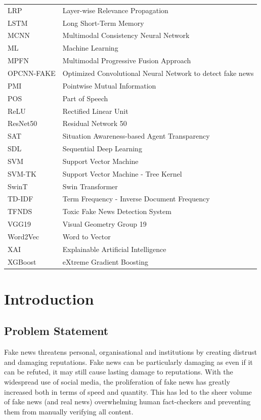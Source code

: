 \documentclass[stu,12pt,floatsintext,donotrepeattitle]{apa7}
\begin{document}
\begin{longtable}{p{3cm} p{10cm}}
LRP & Layer-wise Relevance Propagation \\
LSTM & Long Short-Term Memory \\
MCNN & Multimodal Consistency Neural Network \\
ML & Machine Learning \\
MPFN & Multimodal Progressive Fusion Approach \\
OPCNN-FAKE & Optimized Convolutional Neural Network to detect fake news \\
PMI & Pointwise Mutual Information \\
POS & Part of Speech \\
ReLU & Rectified Linear Unit \\
ResNet50 & Residual Network 50 \\
SAT & Situation Awareness-based Agent Transparency \\
SDL & Sequential Deep Learning \\
SVM & Support Vector Machine \\
SVM-TK & Support Vector Machine - Tree Kernel \\
SwinT & Swin Transformer \\
TD-IDF & Term Frequency - Inverse Document Frequency \\
TFNDS & Toxic Fake News Detection System \\
VGG19 & Visual Geometry Group 19 \\
Word2Vec & Word to Vector \\
XAI & Explainable Artificial Intelligence \\
XGBoost & eXtreme Gradient Boosting \\
\end{longtable}

\clearpage
{}
\setcounter{page}{1}
\section{Introduction}

\subsection{Problem Statement}
Fake news threatens personal, organisational and institutions by creating distrust and damaging reputations. Fake news can be particularly damaging as even if it can be refuted, it may still cause lasting damage to reputations. With the widespread use of social media, the proliferation of fake news has greatly increased both in terms of speed and quantity. This has led to the sheer volume of fake news (and real news) overwhelming human fact-checkers and preventing them from manually verifying all content. 
\end{document}
